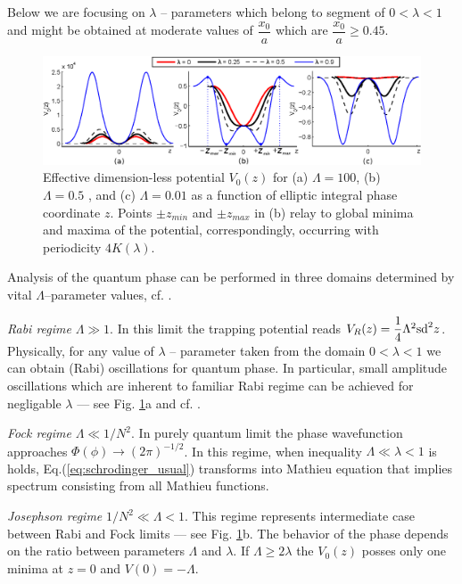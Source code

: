 \documentclass[aps, pre, preprint, groupedaddress, superscriptaddress, showkeys, showpacs] {revtex4-1}
\DeclarePairedDelimiter\ket{\lvert}{\rangle}
\newcommand{\red}{\color{red}}
\begin{document}
Below we are focusing on $\lambda$ -- parameters which belong to segment of $0 < \lambda < 1$ and might be obtained at moderate values of $\dfrac{x_0}{a}$ which are $\dfrac{x_0}{a} \geq 0.45$. 

%
\begin{figure}[ht]
\begin{center}\includegraphics[width=1\linewidth]{pic/potentials.eps}
\end{center}
\caption{
Effective dimension-less potential $V_0(z)$ for (a) $\Lambda = 100$, (b) $\Lambda = 0.5$ , and (c) $\Lambda = 0.01$ as a function of elliptic integral phase coordinate $z$.
Points $\pm z_{min}$ and $\pm z_{max}$ in (b) relay to global minima and maxima of the potential, correspondingly, occurring with periodicity $4K(\lambda)$. \label{phase_potential}}
\end{figure}
%

Analysis of the quantum phase can be performed  in three domains determined by vital $\Lambda$--parameter values, cf. \cite{Anglin}.

\textit{Rabi regime} $\Lambda \gg 1$. In this limit the trapping potential reads $V_R(z) = \dfrac{1}{4} \Lambda^2 \textrm{sd}^2{z}$.
Physically, for any value of $\lambda$ -- parameter taken from the domain 0$<\lambda <1$ we can obtain (Rabi) oscillations for quantum phase.
In particular, small amplitude oscillations which are inherent to familiar Rabi regime can be achieved for negligable $\lambda$ --- see Fig. \ref{phase_potential}a and cf. \cite{Anglin}.

\textit{Fock regime} $\Lambda \ll 1/N^2$.
In purely quantum limit 
the phase wavefunction approaches $\Phi(\phi) \to (2\pi)^{-1/2}$.
In this regime, when inequality $\Lambda \ll \lambda < 1$ is holds, Eq.(\ref{eq:schrodinger_usual}) transforms into Mathieu equation that implies spectrum consisting from all Mathieu functions.

\textit{Josephson regime} $1/N^2\ll\Lambda <1$.
This regime represents intermediate case between Rabi and Fock limits --- see Fig. \ref{phase_potential}b.
The behavior of the phase depends on the ratio between parameters $\Lambda$ and $\lambda$.
If $\Lambda \ge 2\lambda$ the $V_0(z)$ posses only one minima at $z = 0$ and $V(0) = -\Lambda$. 
\end{document}
